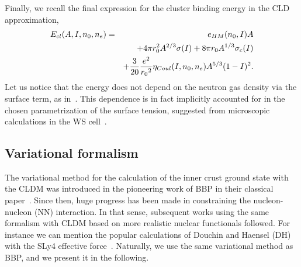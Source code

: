 Finally, we recall the final expression for the cluster binding energy in the
CLD approximation,
%
\begin{eqnarray}
  E_{cl}(A,I,n_0,n_e) =&& e_{HM}(n_0, I)A \notag \\
          &&+ 4\pi r_0^2A^{2/3}\sigma(I) + 8\pi r_0A^{1/3}\sigma_c(I) \notag \\
          &&+ \frac{3}{20}\frac{e^2}{{r_0}^2}\eta_{Coul}(I,n_0,n_e)A^{5/3}(1-I)^2.
          \label{eq:enuc}
\end{eqnarray}
%
Let us notice that the energy does not depend on the neutron gas density via
the surface term, as in~\cite{BBP}. This dependence is in fact implicitly
accounted for in the chosen parametrization of the surface tension, suggested 
from microscopic calculations in the WS cell~\cite{Ravenhall1983}.

\subsection{Variational formalism}\label{subsec:formalism}

The variational method for the calculation of the inner crust ground state
with the CLDM was introduced in the pioneering work of BBP 
in their classical paper~\cite{BBP}. Since then, huge progress has been
made in constraining the nucleon-nucleon (NN) interaction. In that sense, subsequent 
works using the same formalism with CLDM based on more realistic nuclear 
functionals followed. For instance we can mention the popular calculations of 
Douchin and Haensel (DH)~\cite{Douchin2000a, Douchin2000b} with the SLy4 effective 
force~\cite{Chabanat1998}. Naturally, we use the same variational method as
BBP, and we present it in the following.

